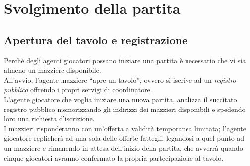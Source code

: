\section{Svolgimento della partita}

\subsection{Apertura del tavolo e registrazione}
Perchè degli agenti giocatori possano iniziare una partita è necessario che vi sia almeno un mazziere disponibile.\\
All'avvio, l'agente mazziere ``apre un tavolo'', ovvero si iscrive ad un \emph{registro pubblico} offrendo i propri servigi di coordinatore.\\
L'agente giocatore che voglia iniziare una nuova partita, analizza il succitato registro pubblico memorizzando gli indirizzi dei mazzieri disponibili e spedendo loro una richiesta d'iscrizione.\\
I mazzieri risponderanno con un'offerta a validità temporanea limitata; l'agente giocatore replicherà ad una sola delle offerte fattegli, legandosi a quel punto ad un mazziere e rimanendo in attesa dell'inizio della partita, che avverrà quando cinque giocatori avranno confermato la propria partecipazione al tavolo.\\

